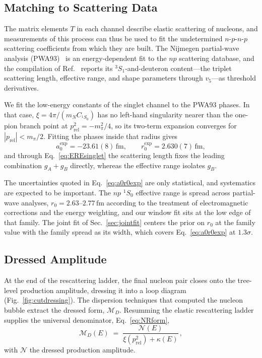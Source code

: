 \documentclass[
  aps,prd,twocolumn,nofootinbib,superscriptaddress,
  longbibliography,floatfix,preprintnumbers
]{revtex4-2}
\newcommand{\prel}{p_{\mathrm{rel}}}
\begin{document}
\subsection{Matching to Scattering Data}
\label{app:match}

The matrix elements $T$ in each channel describe elastic scattering of nucleons, and measurements of this process can thus be
used to fit the undetermined $n$-$p$-$n$-$p$ scattering coefficients from which they are built.
The Nijmegen partial-wave analysis (PWA93)~\cite{Stoks:1993tb}
is an energy-dependent fit to the $np$ scattering database, and the compilation of
Ref.~\cite{deSwart:1995ui} reports its ${}^{3}S_{1}$-and-deuteron
content---the triplet scattering length, effective range, and shape parameters through
$v_5$---as threshold derivatives. 

We fit the low-energy constants of the singlet channel to the PWA93 phases. In that case,
$\xi=4\pi/(m_N C_{^1S_0})$ has no left-hand singularity nearer than the one-pion
branch point at $\prel^2=-m_\pi^2/4$, so its two-term expansion converges for
$|\prel|<m_\pi/2$. Fitting the phases inside that radius gives
\begin{equation}
  a_0^{\mathrm{exp}} = -23.61(8)\,\mathrm{fm}, \qquad
  r_0^{\mathrm{exp}} = 2.630(7)\,\mathrm{fm},
  \label{eq:a0r0exp}
\end{equation}
and through Eq.~\eqref{eq:EREsinglet} the scattering length fixes the leading
combination $g_A+g_B$ directly, whereas the effective range isolates $g_B$.

The uncertainties quoted in Eq.~\eqref{eq:a0r0exp} are only statistical, and systematics are expected to be important. 
The $np$ ${}^{1}S_0$ effective range is spread across partial-wave
analyses, $r_0=2.63$--$2.77\,\mathrm{fm}$ according to the treatment of
electromagnetic corrections and the energy weighting, and our window fit sits at
the low edge of that family. 
The joint fit of Sec.~\ref{sec:jointfit} centers the prior on $r_0$ at the family value with the
family spread as its width,  which covers Eq.~\eqref{eq:a0r0exp} at $1.3\sigma$.

\subsection{Dressed Amplitude}
\label{app:raddress}

At the end of the rescattering ladder, the final nucleon pair closes onto the tree-level production amplitude, dressing it into a loop diagram
(Fig.~\ref{fig:cutdressing}).
The dispersion techniques that computed the nucleon bubble extract the dressed form, $\mathcal{M}_{D}$.
Resumming the elastic rescattering ladder supplies the universal denominator, Eq.~\eqref{eq:NRform},
\begin{equation}
  \mathcal{M}_{D}(E) \;=\;
  \frac{\mathcal{N}(E)}{\xi(\prel^{2})+\kappa(E)}\,,
  \label{eq:Rdef}
\end{equation}
with $\mathcal{N}$ the dressed production amplitude.
\end{document}
